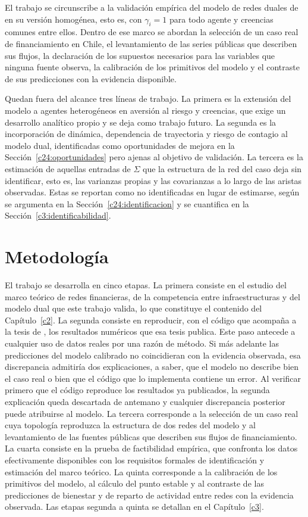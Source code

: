 El trabajo se circunscribe a la validación empírica del modelo de redes duales de  en su versión homogénea, esto es, con $\gamma_i = 1$ para todo agente y creencias comunes entre ellos. Dentro de ese marco se abordan la selección de un caso real de financiamiento en Chile, el levantamiento de las series públicas que describen sus flujos, la declaración de los supuestos necesarios para las variables que ninguna fuente observa, la calibración de los primitivos del modelo y el contraste de sus predicciones con la evidencia disponible.

Quedan fuera del alcance tres líneas de trabajo. La primera es la extensión del modelo a agentes heterogéneos en aversión al riesgo y creencias, que exige un desarrollo analítico propio y se deja como trabajo futuro. La segunda es la incorporación de dinámica, dependencia de trayectoria y riesgo de contagio al modelo dual, identificadas como oportunidades de mejora en la Sección~\ref{c24:oportunidades} pero ajenas al objetivo de validación. La tercera es la estimación de aquellas entradas de $\Sigma$ que la estructura de la red del caso deja sin identificar, esto es, las varianzas propias y las covarianzas a lo largo de las aristas observadas. Estas se reportan como no identificadas en lugar de estimarse, según se argumenta en la Sección~\ref{c24:identificacion} y se cuantifica en la Sección~\ref{c3:identificabilidad}.

\section{Metodología}
\label{c1:metodologia}

El trabajo se desarrolla en cinco etapas. La primera consiste en el estudio del marco teórico de redes financieras, de la competencia entre infraestructuras y del modelo dual que este trabajo valida, lo que constituye el contenido del Capítulo~\ref{c2}. La segunda consiste en reproducir, con el código que acompaña a la tesis de , los resultados numéricos que esa tesis publica. Este paso antecede a cualquier uso de datos reales por una razón de método. Si más adelante las predicciones del modelo calibrado no coincidieran con la evidencia observada, esa discrepancia admitiría dos explicaciones, a saber, que el modelo no describe bien el caso real o bien que el código que lo implementa contiene un error. Al verificar primero que el código reproduce los resultados ya publicados, la segunda explicación queda descartada de antemano y cualquier discrepancia posterior puede atribuirse al modelo. La tercera corresponde a la selección de un caso real cuya topología reproduzca la estructura de dos redes del modelo y al levantamiento de las fuentes públicas que describen sus flujos de financiamiento. La cuarta consiste en la prueba de factibilidad empírica, que confronta los datos efectivamente disponibles con los requisitos formales de identificación y estimación del marco teórico. La quinta corresponde a la calibración de los primitivos del modelo, al cálculo del punto estable y al contraste de las predicciones de bienestar y de reparto de actividad entre redes con la evidencia observada. Las etapas segunda a quinta se detallan en el Capítulo~\ref{c3}.

